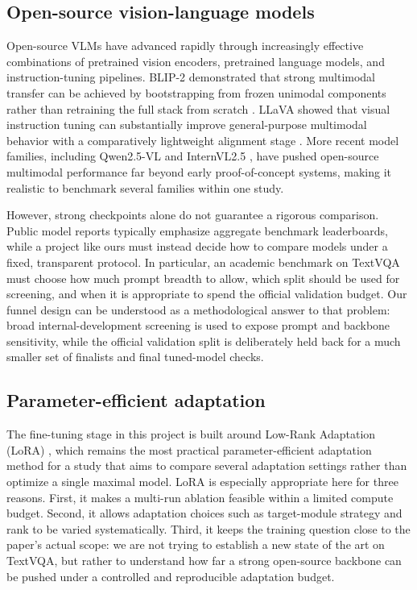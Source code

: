 \subsection{Open-source vision-language models}

Open-source VLMs have advanced rapidly through increasingly effective combinations of pretrained vision encoders, pretrained language models, and instruction-tuning pipelines. BLIP-2 demonstrated that strong multimodal transfer can be achieved by bootstrapping from frozen unimodal components rather than retraining the full stack from scratch \citep{li2023blip2}. LLaVA showed that visual instruction tuning can substantially improve general-purpose multimodal behavior with a comparatively lightweight alignment stage \citep{liu2023visual}. More recent model families, including Qwen2.5-VL \citep{qwen2025qwen25vl} and InternVL2.5 \citep{chen2024internvl25}, have pushed open-source multimodal performance far beyond early proof-of-concept systems, making it realistic to benchmark several families within one study.

However, strong checkpoints alone do not guarantee a rigorous comparison. Public model reports typically emphasize aggregate benchmark leaderboards, while a project like ours must instead decide how to compare models under a fixed, transparent protocol. In particular, an academic benchmark on TextVQA must choose how much prompt breadth to allow, which split should be used for screening, and when it is appropriate to spend the official validation budget. Our funnel design can be understood as a methodological answer to that problem: broad internal-development screening is used to expose prompt and backbone sensitivity, while the official validation split is deliberately held back for a much smaller set of finalists and final tuned-model checks.

\subsection{Parameter-efficient adaptation}

The fine-tuning stage in this project is built around Low-Rank Adaptation (LoRA) \citep{hu2022lora}, which remains the most practical parameter-efficient adaptation method for a study that aims to compare several adaptation settings rather than optimize a single maximal model. LoRA is especially appropriate here for three reasons. First, it makes a multi-run ablation feasible within a limited compute budget. Second, it allows adaptation choices such as target-module strategy and rank to be varied systematically. Third, it keeps the training question close to the paper's actual scope: we are not trying to establish a new state of the art on TextVQA, but rather to understand how far a strong open-source backbone can be pushed under a controlled and reproducible adaptation budget.

